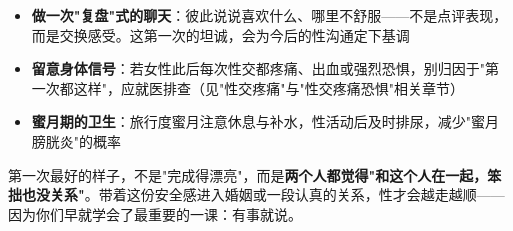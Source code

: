 \begin{itemize}
	\item \textbf{做一次"复盘"式的聊天}：彼此说说喜欢什么、哪里不舒服——不是点评表现，而是交换感受。这第一次的坦诚，会为今后的性沟通定下基调
	\item \textbf{留意身体信号}：若女性此后每次性交都疼痛、出血或强烈恐惧，别归因于"第一次都这样"，应就医排查（见"性交疼痛"与"性交疼痛恐惧"相关章节）
	\item \textbf{蜜月期的卫生}：旅行度蜜月注意休息与补水，性活动后及时排尿，减少"蜜月膀胱炎"的概率
\end{itemize}

\begin{tcolorbox}[colback=pink!5!white,colframe=red!50!black,title=贴心小叮咛]
第一次最好的样子，不是"完成得漂亮"，而是\textbf{两个人都觉得"和这个人在一起，笨拙也没关系"}。带着这份安全感进入婚姻或一段认真的关系，性才会越走越顺——因为你们早就学会了最重要的一课：有事就说。
\end{tcolorbox}

